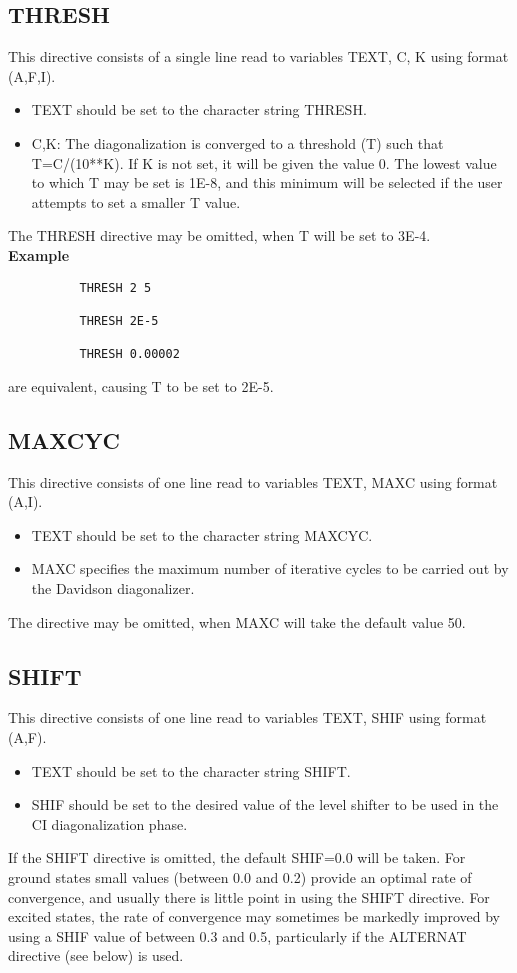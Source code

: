 \documentclass[11pt,fleqn]{article}
\begin{document}
\subsection[THRESH]{THRESH}

This directive consists of a single line read to variables
TEXT, C, K using format (A,F,I).
\begin{itemize}
\item TEXT should be set to the character string THRESH.
\item  C,K: The diagonalization is converged to a threshold (T)
such that T=C/(10**K). If K is not set, it will be
given the value 0. The lowest value to which T may be set is
1E-8, and this minimum will be selected if the user attempts
to set a smaller T value.
\end{itemize}
The THRESH directive may be omitted, when T will be set to 3E-4.\\

{\bf Example}
{
\footnotesize
\begin{verbatim}
          THRESH 2 5
    
          THRESH 2E-5
    
          THRESH 0.00002
\end{verbatim}
}
are equivalent, causing T to be set to 2E-5.


\subsection[MAXCYC]{MAXCYC}

This directive consists of one line read to variables TEXT, MAXC
using format (A,I).
\begin{itemize}
\item  TEXT should be set to the character string MAXCYC.
\item  MAXC specifies the maximum number of iterative cycles to be
carried out by the Davidson  diagonalizer.
\end{itemize}
The directive may be omitted, when MAXC will take the default value 50.

\subsection[SHIFT]{SHIFT}

 This directive consists of one line read to variables TEXT, SHIF using
format (A,F).
\begin{itemize}
\item  TEXT should be set to the character string SHIFT.
\item  SHIF should be set to the desired value of the level shifter to
be used in the CI diagonalization phase.
\end{itemize}
If the SHIFT directive is omitted, the default SHIF=0.0 will be taken.
For ground states small values (between 0.0 and 0.2) provide an optimal
rate of convergence, and usually there is little point in using
the SHIFT directive. For excited states, the rate of convergence may
sometimes be markedly improved by using a SHIF value of between 0.3 and
0.5, particularly if the ALTERNAT directive (see below) is used.
\end{document}
